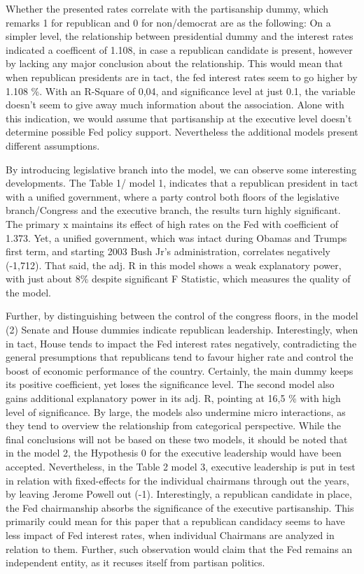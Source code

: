 \documentclass[11pt]{article}
\begin{document}
Whether the presented rates correlate with the partisanship dummy, which remarks 1 for republican and 0 for non/democrat are as the following: On a simpler level, the relationship between presidential dummy and the interest rates indicated a coefficent of 1.108, in case a republican candidate is present, however by lacking any major conclusion about the relationship. This would mean that when republican presidents are in tact, the fed interest rates seem to go higher by 1.108 \%. With an R-Square of 0,04, and significance level at just 0.1, the variable doesn't seem to give away much information about the association. Alone with this indication, we would assume that partisanship at the executive level doesn't determine possible Fed policy support. Nevertheless the additional models present different assumptions.

By introducing legislative branch into the model, we can observe some interesting developments. The Table 1/ model 1, indicates that a republican president in tact with a unified government, where a party control both floors of the legislative branch/Congress and the executive branch, the results turn highly significant. The primary x maintains its effect of high rates on the Fed with coefficient of 1.373. Yet, a unified government, which was intact during Obamas and Trumps first term, and starting 2003 Bush Jr's administration, correlates negatively (-1,712). That said, the adj. R in this model shows a weak explanatory power, with just about 8\% despite significant F Statistic, which measures the quality of the model. \


Further, by distinguishing between the control of the congress floors, in the model (2) Senate and House dummies indicate republican leadership. Interestingly, when in tact, House tends to impact the Fed interest rates negatively, contradicting the general presumptions that republicans tend to favour higher rate and control the boost of economic performance of the country. Certainly, the main dummy keeps its positive coefficient, yet loses the significance level. The second model also gains additional explanatory power in its adj. R, pointing at 16,5 \% with high level of significance.
By large, the models also undermine micro interactions, as they tend to overview the relationship from categorical perspective. While the final conclusions will not be based on these two models, it should be noted that in the model 2, the Hypothesis 0 for the executive leadership would have been accepted.
Nevertheless, in the Table 2 model 3, executive leadership is put in test in relation with fixed-effects for the individual chairmans through out the years, by leaving Jerome Powell out (-1). Interestingly, a republican candidate in place, the Fed chairmanship absorbs the significance of the executive partisanship. This primarily could mean for this paper that a republican candidacy seems to have less impact of Fed interest rates, when individual Chairmans are analyzed in relation to them. Further, such observation would claim that the Fed remains an independent entity, as it recuses itself from partisan politics. \
\end{document}
